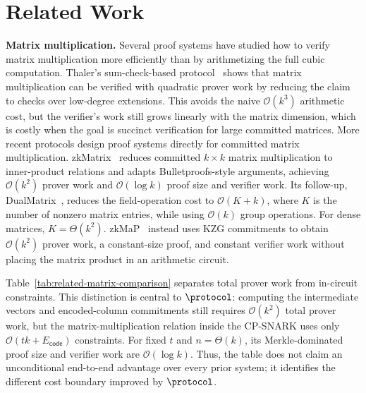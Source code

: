 \section{Related Work}
\label{sec:related}

\noindent\textbf{Matrix multiplication.}
Several proof systems have studied how to verify matrix multiplication more
efficiently than by arithmetizing the full cubic computation. Thaler's
sum-check-based protocol~\cite{thaler2013time} shows that matrix multiplication
can be verified with quadratic prover work by reducing the claim to checks over
low-degree extensions. This avoids the naive \(\mathcal{O}(k^3)\) arithmetic
cost, but the verifier's work still grows linearly with the matrix dimension,
which is costly when the goal is succinct verification for large committed
matrices.
More recent protocols design proof systems directly for committed matrix
multiplication. zkMatrix~\cite{cong2024zkmatrix} reduces committed
\(k\times k\) matrix multiplication to inner-product relations and adapts
Bulletproofs-style arguments, achieving \(\mathcal{O}(k^2)\) prover work and
\(\mathcal{O}(\log k)\) proof size and verifier work. Its follow-up,
DualMatrix~\cite{cong2026dualmatrix}, reduces the field-operation cost to
\(\mathcal{O}(K+k)\), where \(K\) is the number of nonzero matrix entries, while
using \(\mathcal{O}(k)\) group operations. For dense matrices,
\(K=\Theta(k^2)\). zkMaP~\cite{zkMaP} instead uses KZG commitments to obtain
\(\mathcal{O}(k^2)\) prover work, a constant-size proof, and constant verifier
work without placing the matrix product in an arithmetic circuit.

Table~\ref{tab:related-matrix-comparison} separates total prover work from
in-circuit constraints. This distinction is central to \(\protocol\): computing
the intermediate vectors and encoded-column commitments still requires
\(\mathcal{O}(k^2)\) total prover work, but the matrix-multiplication relation
inside the CP-SNARK uses only
\(\mathcal{O}(tk+E_{\mathsf{code}})\) constraints. For fixed \(t\) and
\(n=\Theta(k)\), its Merkle-dominated proof size and verifier work are
\(\mathcal{O}(\log k)\). Thus, the table does not claim an unconditional
end-to-end advantage over every prior system; it identifies the different cost
boundary improved by \(\protocol\).

